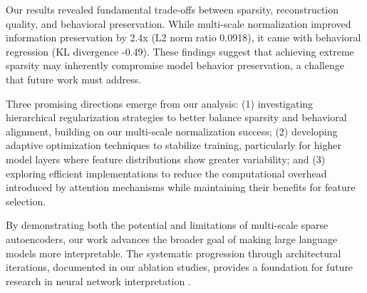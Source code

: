 \documentclass{article} %
\begin{document}
Our results revealed fundamental trade-offs between sparsity, reconstruction quality, and behavioral preservation. While multi-scale normalization improved information preservation by 2.4x (L2 norm ratio 0.0918), it came with behavioral regression (KL divergence -0.49). These findings suggest that achieving extreme sparsity may inherently compromise model behavior preservation, a challenge that future work must address.

Three promising directions emerge from our analysis: (1) investigating hierarchical regularization strategies to better balance sparsity and behavioral alignment, building on our multi-scale normalization success; (2) developing adaptive optimization techniques to stabilize training, particularly for higher model layers where feature distributions show greater variability; and (3) exploring efficient implementations to reduce the computational overhead introduced by attention mechanisms while maintaining their benefits for feature selection.

By demonstrating both the potential and limitations of multi-scale sparse autoencoders, our work advances the broader goal of making large language models more interpretable. The systematic progression through architectural iterations, documented in our ablation studies, provides a foundation for future research in neural network interpretation \cite{goodfellow2016deep}.



\end{document}
